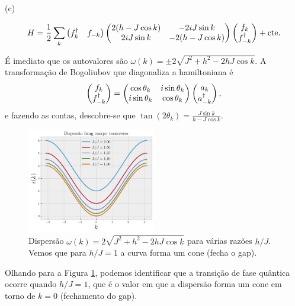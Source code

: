 \documentclass[a4paper,10pt]{article}
\begin{document}
(c)

\n\n\n\n\n\n
$$
H =
\frac{1}{2}
\sum_{k}
\begin{pmatrix}
f_k^\dagger & f_{-k}
\end{pmatrix}
\begin{pmatrix}
2(h - J \cos k) & -2iJ \sin k \\
2iJ \sin k & -2(h - J\cos k)
\end{pmatrix}
\begin{pmatrix}
f_k \\ f_{-k}^\dagger
\end{pmatrix}
+ \text{cte}.
$$

É imediato que os autovalores são $\omega(k) = \pm 2\sqrt{J^2 + h^2 - 2hJ \cos k}$. A transformação de Bogoliubov que diagonaliza a hamiltoniana é
$$
\begin{pmatrix}
f_k \\ f_{-k}^\dagger
\end{pmatrix}
=
\begin{pmatrix}
 \cos \theta_k & i\sin \theta_k  \\
i\sin \theta_k &  \cos \theta_k
\end{pmatrix}
\begin{pmatrix}
a_k \\ a_{-k}^\dagger
\end{pmatrix},
$$
e fazendo as contas, descobre-se que $\tan(2\theta_k) = \frac{J \sin k}{h - J \cos k}$.

\begin{figure}[H]
\centering
\includegraphics[width=0.5\textwidth]{fig/transv_ising.png}
\caption{Dispersão $\omega(k) = 2\sqrt{J^2 + h^2 - 2hJ \cos k}$ para várias razões $h/J$. Vemos que para $h/J = 1$ a curva forma um cone (fecha o gap).}
\label{fig:transv_ising}
\end{figure}

Olhando para a Figura \ref{fig:transv_ising}, podemos identificar que a transição de fase quântica ocorre quando $h/J = 1$, que é o valor em que a dispersão forma um cone em torno de $k = 0$ (fechamento do gap).
\end{document}
